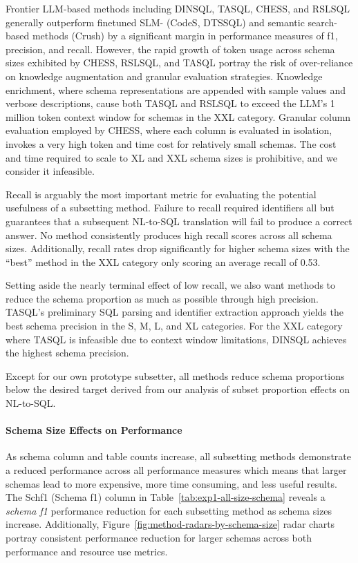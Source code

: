Frontier LLM-based methods including DINSQL, TASQL, CHESS, and RSLSQL generally outperform finetuned SLM- (CodeS, DTSSQL) and semantic search-based methods (Crush) by a significant margin in performance measures of f1, precision, and recall.
However, the rapid growth of token usage across schema sizes exhibited by CHESS, RSLSQL, and TASQL portray the risk of over-reliance on knowledge augmentation and granular evaluation strategies.
Knowledge enrichment, where schema representations are appended with sample values and verbose descriptions, cause both TASQL and RSLSQL to exceed 
the LLM's 1 million token context window for schemas in the XXL category.
Granular column evaluation employed by CHESS, where each column is evaluated in isolation, invokes a very high token and time cost for relatively small schemas.
The cost and time required to scale to XL and XXL schema sizes is prohibitive, and we consider it infeasible.

Recall is arguably the most important metric for evaluating the potential usefulness of a subsetting method. 
Failure to recall required identifiers all but guarantees that a subsequent NL-to-SQL translation will fail to produce a correct answer.
No method consistently produces high recall scores across all schema sizes.
Additionally, recall rates drop significantly for higher schema sizes with the ``best'' method in the XXL category only scoring an average recall of 0.53.

Setting aside the nearly terminal effect of low recall, we also want methods to reduce the schema proportion as much as possible through high precision.
TASQL's preliminary SQL parsing and identifier extraction approach yields the best schema precision in the S, M, L, and XL categories.
For the XXL category where TASQL is infeasible due to context window limitations, DINSQL achieves the highest schema precision.

Except for our own \PROJECTNAME{ }prototype subsetter, all methods reduce schema proportions below the desired target derived from our analysis of subset proportion effects on NL-to-SQL.



\paragraph{\textbf{Schema Size Effects on Performance}}

As schema column and table counts increase, all subsetting methods demonstrate a reduced performance across all performance measures which means that larger schemas lead to more expensive, more time consuming, and less useful results.
The Schf1 (Schema f1) column in Table~\ref{tab:exp1-all-size-schema} reveals a \emph{schema f1} performance reduction for each subsetting method as schema sizes increase.
Additionally, Figure~\ref{fig:method-radars-by-schema-size} radar charts portray consistent performance reduction for larger schemas across both performance and resource use metrics.

